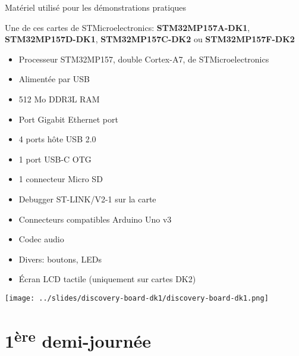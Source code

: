 \documentclass[a4paper,12pt,obeyspaces,spaces,hyphens]{article}
\begin{document}
\feshowtitle

\certificate{}
\disabilities{}

\feagendatwocolumn
{Matériel utilisé pour les démonstrations pratiques}
{
  Une de ces cartes de STMicroelectronics: {\bf
  STM32MP157A-DK1}, {\bf STM32MP157D-DK1}, {\bf STM32MP157C-DK2} ou
  {\bf STM32MP157F-DK2}
  \begin{itemize}
  \item Processeur STM32MP157, double Cortex-A7, de STMicroelectronics
  \item Alimentée par USB
  \item 512 Mo DDR3L RAM
  \item Port Gigabit Ethernet port
  \item 4 ports hôte USB 2.0
  \item 1 port USB-C OTG
  \item 1 connecteur Micro SD
  \item Debugger ST-LINK/V2-1 sur la carte
  \item Connecteurs compatibles Arduino Uno v3
  \item Codec audio
  \item Divers: boutons, LEDs
  \item Écran LCD tactile (uniquement sur cartes DK2)
  \end{itemize}
}{}
{
  \begin{center}
    \texttt{[image: ../slides/discovery-board-dk1/discovery-board-dk1.png]}
  \end{center}
}

\section{1\textsuperscript{ère} demi-journée}
\end{document}
